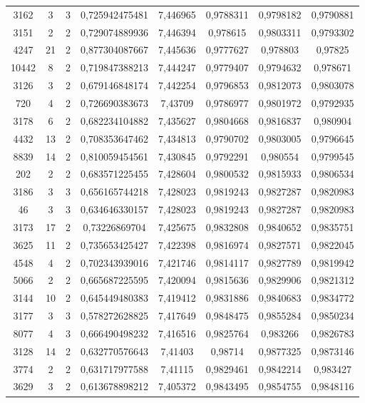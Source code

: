\begin{longtable}{|c|c|c|c|c|c|c|c|}
3162 & 3 & 3 & 0,725942475481 & 7,446965 & 0,9788311 & 0,9798182 & 0,9790881 \\
3151 & 2 & 2 & 0,729074889936 & 7,446394 & 0,978615 & 0,9803311 & 0,9793302 \\
4247 & 21 & 2 & 0,877304087667 & 7,445636 & 0,9777627 & 0,978803 & 0,97825 \\
10442 & 8 & 2 & 0,719847388213 & 7,444247 & 0,9779407 & 0,9794632 & 0,978671 \\
3126 & 3 & 2 & 0,679146848174 & 7,442254 & 0,9796853 & 0,9812073 & 0,9803078 \\
720 & 4 & 2 & 0,726690383673 & 7,43709 & 0,9786977 & 0,9801972 & 0,9792935 \\
3178 & 6 & 2 & 0,682234104882 & 7,435627 & 0,9804668 & 0,9816837 & 0,980904 \\
4432 & 13 & 2 & 0,708353647462 & 7,434813 & 0,9790702 & 0,9803005 & 0,9796645 \\
8839 & 14 & 2 & 0,810059454561 & 7,430845 & 0,9792291 & 0,980554 & 0,9799545 \\
202 & 2 & 2 & 0,683571225455 & 7,428604 & 0,9800532 & 0,9815933 & 0,9806534 \\
3186 & 3 & 3 & 0,656165744218 & 7,428023 & 0,9819243 & 0,9827287 & 0,9820983 \\
46 & 3 & 3 & 0,634646330157 & 7,428023 & 0,9819243 & 0,9827287 & 0,9820983 \\
3173 & 17 & 2 & 0,73226869704 & 7,425675 & 0,9832808 & 0,9840652 & 0,9835751 \\
3625 & 11 & 2 & 0,735653425427 & 7,422398 & 0,9816974 & 0,9827571 & 0,9822045 \\
4548 & 4 & 2 & 0,702343939016 & 7,421746 & 0,9814117 & 0,9827789 & 0,9819942 \\
5066 & 2 & 2 & 0,665687225595 & 7,420094 & 0,9815636 & 0,9829906 & 0,9821312 \\
3144 & 10 & 2 & 0,645449480383 & 7,419412 & 0,9831886 & 0,9840683 & 0,9834772 \\
3177 & 3 & 3 & 0,578272628825 & 7,417649 & 0,9848475 & 0,9855284 & 0,9850234 \\
8077 & 4 & 3 & 0,666490498232 & 7,416516 & 0,9825764 & 0,983266 & 0,9826783 \\
3128 & 14 & 2 & 0,632770576643 & 7,41403 & 0,98714 & 0,9877325 & 0,9873146 \\
3774 & 2 & 2 & 0,631717977588 & 7,41115 & 0,9829461 & 0,9842214 & 0,983427 \\
3629 & 3 & 2 & 0,613678898212 & 7,405372 & 0,9843495 & 0,9854755 & 0,9848116 \\

\end{longtable}

